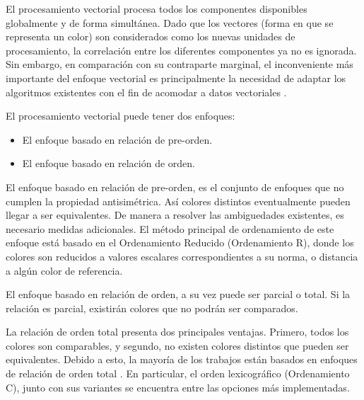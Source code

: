 
El procesamiento vectorial procesa todos los componentes disponibles globalmente y de forma simult\'anea.
Dado que los vectores (forma en que se representa un color) son considerados como los nuevas unidades de procesamiento, la correlaci\'on entre los diferentes componentes ya no es ignorada. Sin embargo, en comparaci\'on con su contraparte marginal, el inconveniente m\'as importante del enfoque vectorial es principalmente la necesidad de adaptar los algoritmos existentes con el fin de acomodar a datos vectoriales \cite{aptoula2007comparative}. 


El procesamiento vectorial puede tener dos enfoques:
 
\begin{itemize}
    \item El enfoque basado en relaci\'on de pre-orden.
    \item El enfoque basado en relaci\'on de orden.
\end{itemize}

El enfoque basado en relaci\'on de pre-orden, es el conjunto de enfoques que no cumplen la propiedad antisim\'etrica.  As\'i colores distintos eventualmente pueden llegar a ser equivalentes. De manera a resolver las ambiguedades existentes, es necesario medidas adicionales. El m\'etodo principal de ordenamiento de este enfoque est\'a basado en el Ordenamiento Reducido (Ordenamiento R), donde los colores son reducidos a valores escalares correspondientes a su norma, o distancia a alg\'un color de referencia. 


El enfoque basado en relaci\'on de orden, a su vez puede ser parcial o total. Si la relaci\'on es parcial, existir\'an colores que no podr\'an ser comparados. 

La relaci\'on de orden total presenta dos principales ventajas. Primero, todos los colores son comparables, y segundo, no existen colores distintos que pueden ser equivalentes. Debido a esto, la mayor\'ia de los trabajos est\'an basados en enfoques de relaci\'on de orden total \cite{aptoula2007comparative}. En particular, el orden lexicogr\'afico (Ordenamiento C), junto con sus variantes se encuentra entre las opciones m\'as implementadas.  
 


